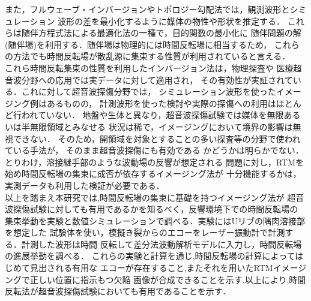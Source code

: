また，フルウェーブ・インバージョンやトポロジー勾配法では，観測波形とシミュレーション
波形の差を最小化するように媒体の物性や形状を推定する．
これらは随伴方程式法による最適化法の一種で，目的関数の最小化に
随伴問題の解(随伴場)を利用する．随伴場は物理的には時間反転場に相当するため，
これらの方法でも時間反転場が散乱源に集束する性質が利用されていると言える．
\\
\hspace{\parindent}
これら時間反転集束の性質を利用したインバージョン法は，物理探査\cite{Fichtner, Etgen2009}や
医療超音波分野\cite{FinkTextBook, Tanter2000}への応用では実データに対して適用され，
その有効性が実証されている．これに対して超音波探傷分野では，
シミュレーション波形を使ったイメージング例\cite{KK_RTM,Saitoh2021}はあるものの，
計測波形を使った検討や実際の探傷への利用はほとんど行われていない．
地盤や生体と異なり，超音波探傷試験では媒体を無限あるいは半無限領域とみなせる
状況は稀で，イメージングにおいて境界の影響は無視できない．
そのため，開領域を対象とすることの多い探査等の分野で使われている手法が，
そのまま超音波探傷にも有効である
かどうかは明らかでない．とりわけ，溶接継手部のような波動場の反響が想定される
問題に対し，RTMを始め時間反転場の集束に成否が依存するイメージング法が
十分機能するかは，実測データも利用した検証が必要である．
\\
\hspace{\parindent}
以上を踏まえ本研究では,時間反転場の集束に基礎を持つイメージング法が
超音波探傷試験に対しても有用であるかを知るべく，反響環境下での時間反転場の
集束挙動を実験と数値シミュレーションで調べる．実験にはUリブの隅肉溶接部を想定した
試験体を使い，模擬き裂からのエコーをレーザー振動計で計測する．計測した波形は時間
反転して差分法波動解析モデルに入力し，時間反転場の進展挙動を調べる．
これらの実験と計算を通じ,時間反転場の計算によってはじめて見出される有用な
エコーが存在すること,またそれを用いたRTMイメージングで正しい位置に指示もつ欠陥
画像が合成できることを示す.以上により,時間反転法が超音波探傷試験においても有用であることを示す．

